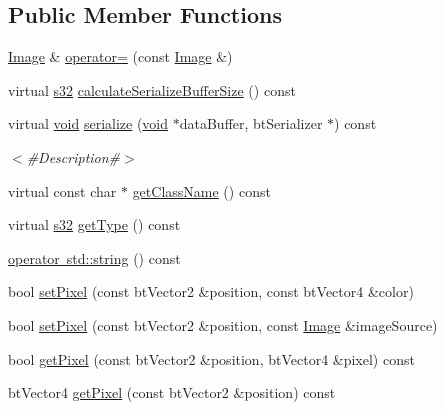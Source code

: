 \subsection*{Public Member Functions}
\begin{DoxyCompactItemize}
\item 
\mbox{\hyperlink{classnjli_1_1_image}{Image}} \& \mbox{\hyperlink{classnjli_1_1_image_aab23700775beca98edc5219f171160a3}{operator=}} (const \mbox{\hyperlink{classnjli_1_1_image}{Image}} \&)
\item 
virtual \mbox{\hyperlink{_util_8h_aa62c75d314a0d1f37f79c4b73b2292e2}{s32}} \mbox{\hyperlink{classnjli_1_1_image_a43158ae3c64f273ef22a7ed50adc5c5e}{calculate\+Serialize\+Buffer\+Size}} () const
\item 
virtual \mbox{\hyperlink{_thread_8h_af1e856da2e658414cb2456cb6f7ebc66}{void}} \mbox{\hyperlink{classnjli_1_1_image_afcb866b82c4c82524678b261bd1963ed}{serialize}} (\mbox{\hyperlink{_thread_8h_af1e856da2e658414cb2456cb6f7ebc66}{void}} $\ast$data\+Buffer, bt\+Serializer $\ast$) const
\begin{DoxyCompactList}\small\item\em $<$\#\+Description\#$>$ \end{DoxyCompactList}\item 
virtual const char $\ast$ \mbox{\hyperlink{classnjli_1_1_image_a2c590a3db2a2e904e2add90afbc00cb3}{get\+Class\+Name}} () const
\item 
virtual \mbox{\hyperlink{_util_8h_aa62c75d314a0d1f37f79c4b73b2292e2}{s32}} \mbox{\hyperlink{classnjli_1_1_image_ad41536b7d4585ccae0673892d9bbcf3d}{get\+Type}} () const
\item 
\mbox{\hyperlink{classnjli_1_1_image_a5a736a22ab41755f1fa37fd3980d8729}{operator std\+::string}} () const
\item 
bool \mbox{\hyperlink{classnjli_1_1_image_a9832dbb9ccd17a73581cb8ba3425adac}{set\+Pixel}} (const bt\+Vector2 \&position, const bt\+Vector4 \&color)
\item 
bool \mbox{\hyperlink{classnjli_1_1_image_a3e991778945527967f1051433d12bafb}{set\+Pixel}} (const bt\+Vector2 \&position, const \mbox{\hyperlink{classnjli_1_1_image}{Image}} \&image\+Source)
\item 
bool \mbox{\hyperlink{classnjli_1_1_image_add817e9d5d8ce5e0fb9913c8c0c78f9b}{get\+Pixel}} (const bt\+Vector2 \&position, bt\+Vector4 \&pixel) const
\item 
bt\+Vector4 \mbox{\hyperlink{classnjli_1_1_image_acc74a1af9db48b1631359fb3aa54e66c}{get\+Pixel}} (const bt\+Vector2 \&position) const

\end{DoxyCompactItemize}
